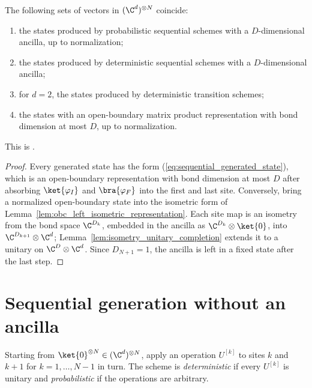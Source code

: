 \begin{theorem}
    \label{thm:sequential_generation_ancilla}
    The following sets of vectors in $(\C^d)^{\otimes N}$ coincide:
    \begin{enumerate}
        \item the states produced by probabilistic sequential schemes with a
              $D$-dimensional ancilla, up to normalization;
        \item the states produced by deterministic sequential schemes with a
              $D$-dimensional ancilla;
        \item for $d=2$, the states produced by deterministic transition schemes;
        \item the states with an open-boundary matrix product representation
              with bond dimension at most $D$, up to normalization.
    \end{enumerate}
    This is \cite[Theorem~13, Section~5.1]{PerezGarcia2007Matrix}.
\end{theorem}
\begin{proof}
    Every generated state has the form (\ref{eq:sequential_generated_state}),
    which is an open-boundary representation with bond dimension at most $D$
    after absorbing $\ket{\varphi_I}$ and $\bra{\varphi_F}$ into the first and
    last site. Conversely, bring a normalized open-boundary state into the
    isometric form of Lemma~\ref{lem:obc_left_isometric_representation}. Each
    site map is an isometry from the bond space $\C^{D_k}$, embedded in the
    ancilla as $\C^{D_k}\otimes\ket{0}$, into $\C^{D_{k+1}}\otimes\C^d$;
    Lemma~\ref{lem:isometry_unitary_completion} extends it to a unitary on
    $\C^D\otimes\C^d$. Since $D_{N+1}=1$, the ancilla is left in a fixed
    state after the last step.
\end{proof}

\section{Sequential generation without an ancilla}

\begin{definition}
    \label{def:sequential_scheme_no_ancilla}
    Starting from $\ket{0}^{\otimes N}\in(\C^d)^{\otimes N}$, apply an
    operation $U^{[k]}$ to sites $k$ and $k+1$ for $k=1,\dots,N-1$ in turn. The
    scheme is \emph{deterministic} if every $U^{[k]}$ is unitary and
    \emph{probabilistic} if the operations are arbitrary.
\end{definition}

